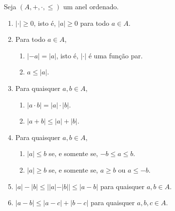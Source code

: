 \begin{proposition}
    Seja $(A, +, \cdot, \leq)$ um anel ordenado.
        \begin{enumerate}[leftmargin=*, align=left, label=\textbf{(\alph*)}]
            \item $|\cdot| \geq 0$, isto é, $|a| \geq 0$ para todo $a \in A$.
            \item Para todo $a \in A$,
                \begin{enumerate}[label=\roman*.]
                    \item $|-a| = |a|$, isto é, $|\cdot|$ é uma função par.
                    \item $a \leq |a|$.
                \end{enumerate}
            \item Para quaisquer $a,b \in A$,
                \begin{enumerate}[label=\roman*.]
                    \item $|a \cdot b| = |a| \cdot |b|$.
                    \item $|a + b| \leq |a| + |b|$.
                \end{enumerate}
            \item Para quaisquer $a,b \in A$,
                \begin{enumerate}[label=\roman*.]
                    \item $|a| \leq b$ se, e somente se, $-b \leq a \leq b$.
                    \item $|a| \geq b$ se, e somente se, $a \geq b$ ou $a \leq -b$.
                \end{enumerate}
            \item $|a| - |b| \leq ||a|-|b|| \leq |a-b|$ para quaisquer $a, b \in A$.
            \item $|a-b| \leq |a-c| + |b-c|$ para quaisquer $a, b, c \in A$.
        \end{enumerate}
\end{proposition}

